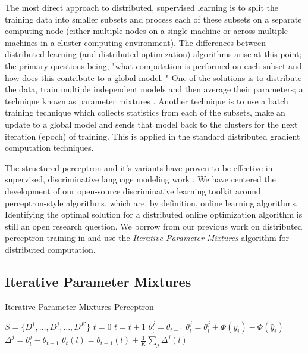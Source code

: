 \documentclass[a4paper]{article}
\let\textquotedbl="
\begin{document}
The most direct approach to distributed, supervised learning is to
split the training data into smaller subsets and process each of these
subsets on a separate computing node (either multiple nodes on a single
machine or across multiple machines in a cluster computing environment).
The differences between distributed learning (and distributed optimization)
algorithms arise at this point; the primary questions being,
 \textquotedbl{}what computation is performed on each subset and how does this
contribute to a global model.  \textquotedbl{}
One of the solutions is to distribute the data, train multiple
independent models and then average their parameters; a technique known
as parameter mixtures \cite{gmann2009}. Another technique is to use a batch training
technique which collects statistics from each of the subsets, make
an update to a global model and sends that model back to the clusters
for the next iteration (epoch) of training. This is applied in the
standard distributed gradient computation techniques.

The structured perceptron \cite{Collins02b} and it's variants have proven to
be effective in supervised, discriminative language modeling work
\cite{Roark07}.  We have centered the development of 
our open-source discriminative learning toolkit around perceptron-style
algorithms, which are, by definition, online learning algorithms. Identifying the
optimal solution for a distributed online optimization algorithm is still an open
research question. We borrow from our previous work on distributed perceptron
training in \cite{mcdonald10distributed,hall10distributed} and use the
\emph{Iterative Parameter Mixtures} algorithm for distributed computation.

\subsection{Iterative Parameter Mixtures}
\begin{algorithm}[h]
\scriptsize
\caption{Iterative Parameter Mixtures Perceptron}
\label{alg:IPM}
\begin{algorithmic}
  \State {}
  \State $S=\{D^{1},\ldots,D^{j},\ldots,D^{K}\}$ 
  \State $t=0$
  \Repeat
    \State $t=t+1$
     
      \State $\theta_{t}^{j}=\theta_{t-1}$
          \State {}
          \State $\theta_{t}^{j}=\theta_{t}^{j}+\Phi(y_{i})-\Phi(\hat{y}_{i})$
        \EndIf
      \EndFor
      \State $\Delta^{j}=\theta_{t}^{j}-\theta_{t-1}$
    \EndFor
     
      \State $\theta_{t}(l)=\theta_{t-1}(l)+\frac{1}{K}\sum_{j}\Delta^{j}(l)$
    \EndFor
   \end{algorithmic} 
\normalsize
\end{algorithm}
\end{document}
